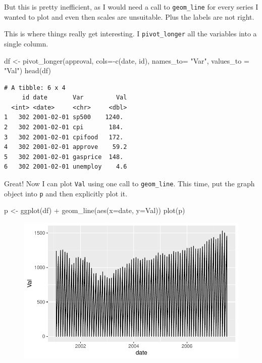 \documentclass[
  letterpaper,
]{book}
\newenvironment{Shaded}{\begin{snugshade}}{\end{snugshade}}
\newcommand{\AttributeTok}[1]{\textcolor[rgb]{0.40,0.45,0.13}{#1}}
\newcommand{\FunctionTok}[1]{\textcolor[rgb]{0.28,0.35,0.67}{#1}}
\newcommand{\NormalTok}[1]{\textcolor[rgb]{0.00,0.23,0.31}{#1}}
\newcommand{\OtherTok}[1]{\textcolor[rgb]{0.00,0.23,0.31}{#1}}
\newcommand{\SpecialCharTok}[1]{\textcolor[rgb]{0.37,0.37,0.37}{#1}}
\newcommand{\StringTok}[1]{\textcolor[rgb]{0.13,0.47,0.30}{#1}}
\begin{document}
But this is pretty inefficient, as I would need a call to
\texttt{geom\_line} for every series I wanted to plot and even then
scales are unsuitable. Plus the labels are not right.

This is where things really get interesting. I \texttt{pivot\_longer}
all the variables into a single column.

\begin{Shaded}
\begin{Highlighting}[]
\NormalTok{df }\OtherTok{\textless{}{-}} \FunctionTok{pivot\_longer}\NormalTok{(approval, }\AttributeTok{cols=}\SpecialCharTok{{-}}\FunctionTok{c}\NormalTok{(date, id), }\AttributeTok{names\_to=} \StringTok{"Var"}\NormalTok{, }\AttributeTok{values\_to =} \StringTok{"Val"}\NormalTok{)}
\FunctionTok{head}\NormalTok{(df)}
\end{Highlighting}
\end{Shaded}

\begin{verbatim}
# A tibble: 6 x 4
     id date       Var         Val
  <int> <date>     <chr>     <dbl>
1   302 2001-02-01 sp500    1240. 
2   302 2001-02-01 cpi       184. 
3   302 2001-02-01 cpifood   172. 
4   302 2001-02-01 approve    59.2
5   302 2001-02-01 gasprice  148. 
6   302 2001-02-01 unemploy    4.6
\end{verbatim}

Great! Now I can plot \texttt{Val} using one call to
\texttt{geom\_line}. This time, put the graph object into \texttt{p} and
then explicitly plot it.

\begin{Shaded}
\begin{Highlighting}[]
\NormalTok{p  }\OtherTok{\textless{}{-}} \FunctionTok{ggplot}\NormalTok{(df) }\SpecialCharTok{+}
  \FunctionTok{geom\_line}\NormalTok{(}\FunctionTok{aes}\NormalTok{(}\AttributeTok{x=}\NormalTok{date, }\AttributeTok{y=}\NormalTok{Val))}
\FunctionTok{plot}\NormalTok{(p)}
\end{Highlighting}
\end{Shaded}

\begin{figure}[H]

{\centering \includegraphics{Appendix1_files/figure-pdf/unnamed-chunk-7-1.pdf}

}

\end{figure}
\end{document}
